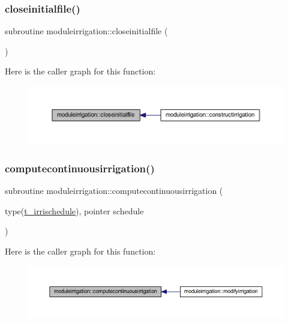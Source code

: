 \subsubsection{\texorpdfstring{closeinitialfile()}{closeinitialfile()}}
{\footnotesize\ttfamily subroutine moduleirrigation\+::closeinitialfile (\begin{DoxyParamCaption}{ }\end{DoxyParamCaption})\hspace{0.3cm}{\ttfamily [private]}}

Here is the caller graph for this function\+:\nopagebreak
\begin{figure}[H]
\begin{center}
\leavevmode
\includegraphics[width=350pt]{namespacemoduleirrigation_a8b1ff94a2633495022dd8e0f95fd56a6_icgraph}
\end{center}
\end{figure}
\mbox{\label{namespacemoduleirrigation_a199776e3a4c64d2997f9a5b51681d1f6}} 
\subsubsection{\texorpdfstring{computecontinuousirrigation()}{computecontinuousirrigation()}}
{\footnotesize\ttfamily subroutine moduleirrigation\+::computecontinuousirrigation (\begin{DoxyParamCaption}\item[{type(\mbox{\hyperlink{structmoduleirrigation_1_1t__irrischedule}{t\+\_\+irrischedule}}), pointer}]{schedule }\end{DoxyParamCaption})\hspace{0.3cm}{\ttfamily [private]}}

Here is the caller graph for this function\+:\nopagebreak
\begin{figure}[H]
\begin{center}
\leavevmode
\includegraphics[width=350pt]{namespacemoduleirrigation_a199776e3a4c64d2997f9a5b51681d1f6_icgraph}
\end{center}
\end{figure}
\mbox{\label{namespacemoduleirrigation_ad1bea8412119ae05c2eb3e177bcaed44}} 
